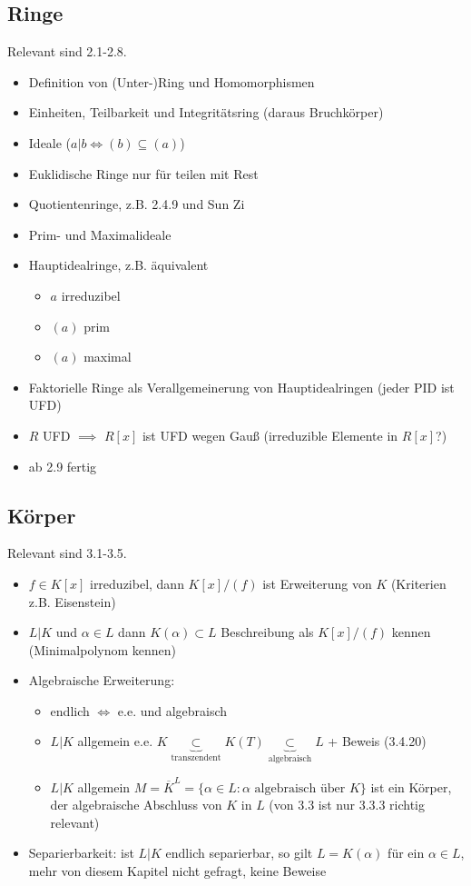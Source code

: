 \documentclass[a4paper, 12pt]{article}
\begin{document}
\subsection{Ringe}
Relevant sind 2.1-2.8.
\begin{itemize}
	\item Definition von (Unter-)Ring und Homomorphismen
	\item Einheiten, Teilbarkeit und Integritätsring (daraus Bruchkörper)
	\item Ideale ($a|b \Leftrightarrow (b) \subseteq (a)$)
	\item Euklidische Ringe nur für teilen mit Rest
	\item Quotientenringe, z.B. 2.4.9 und Sun Zi
	\item Prim- und Maximalideale
	\item Hauptidealringe, z.B. äquivalent \begin{itemize}
		\item $a$ irreduzibel
		\item $(a)$ prim
		\item $(a)$ maximal
	\end{itemize}
	\item Faktorielle Ringe als Verallgemeinerung von Hauptidealringen (jeder PID ist UFD)
	\item $R$ UFD $\implies$ $R[x]$ ist UFD wegen Gauß (irreduzible Elemente in $R[x]$?)
	\item ab 2.9 fertig
\end{itemize}
\subsection{Körper}
Relevant sind 3.1-3.5.
\begin{itemize}
	\item $f \in K[x]$ irreduzibel, dann $K[x]/(f)$ ist Erweiterung von $K$ (Kriterien z.B. Eisenstein)
	\item $L|K$ und $\alpha \in L$ dann $K(\alpha) \subset L$ Beschreibung als $K[x]/(f)$ kennen (Minimalpolynom kennen)
	\item Algebraische Erweiterung: \begin{itemize}
		\item endlich $\iff$ e.e. und algebraisch
		\item $L|K$ allgemein e.e. $K\underbrace{\subset}_{\text{transzendent}} K(T) \underbrace{\subset}_{\text{algebraisch}} L$ + Beweis (3.4.20)
		\item $L|K$ allgemein $M = \overline{K}^L = \{\alpha \in L: \alpha \text{ algebraisch über } K\}$ ist ein Körper, der algebraische Abschluss von $K$ in $L$ (von 3.3 ist nur 3.3.3 richtig relevant)
	\end{itemize}
	\item Separierbarkeit: ist $L|K$ endlich separierbar, so gilt $L = K(\alpha)$ für ein $\alpha \in L$, mehr von diesem Kapitel nicht gefragt, keine Beweise
\end{itemize}
\end{document}
